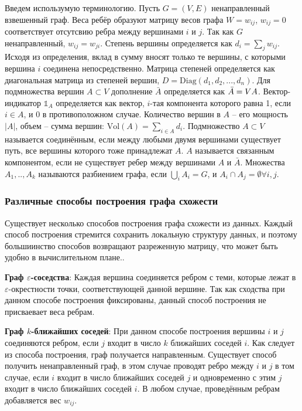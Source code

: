Введем использумую терминологию. Пусть $G=(V,E)$ ненаправленный взвешенный граф. Веса ребёр образуют матрицу весов графа $W = w_{ij}$, $w_{ij}=0$ соответствует отсутсвию ребра между вершинами $i$ и $j$. Так как $G$ ненаправленный, $w_{ij} = w_{ji}$. Степень вершины определяется как $d_i = \sum_j w_{ij}$. Исходя из определения, вклад в сумму вносят только те вершины, с которыми вершина $i$ соединена непосредственно. Матрица степеней определяется как диагональная матрица из степеней вершин, $D=\text{Diag}(d_1,d_2,...,d_n)$. Для подмножества вершин $A \subset V$ дополнение $\bar{A}$ определяется как $\bar{A} = V \\ A$. Вектор-индикатор $\mathbb{1}_A$ определяется как вектор, $i$-тая компонента которого равна 1, если $i \in A$, и 0 в противоположном случае. Количество вершин в $A$ -- его мощность $|A|$, объем -- сумма вершин: $\text{Vol}(A) = \sum_{i \in A} d_i$. Подмножество $A \subset V$ называется соединённым, если между любыми двумя вершинами существует путь, все вершины которого тоже принадлежат $A$. $A$ называется связанным компонентом, если не существует ребер между вершинами $A$ и $\bar{A}$. Множества $A_1,..,A_k$ называются разбиением графа, если $\bigcup_i A_i = G$, и $A_i \cap A_j = \emptyset \forall i,j$.

\subsubsection{Различные способы построения графа схожести}
Существует несколько способов построения графа схожести из данных. Каждый способ построения стремится сохранить локальную структуру данных, и поэтому большиинство способов возвращают разреженную матрицу, что может быть удобно в вычислительном плане\cite{von2007tutorial}..

\textbf{Граф $\varepsilon$-соседства}: Каждая вершина соединяется ребром с теми, которые лежат в $\varepsilon$-окрестности точки, соответствующей данной вершине. Так как сходства при данном способе построения фиксированы, данный способ построения не присваевает веса ребрам.

\textbf{Граф $k$-ближайших соседей}: При данном способе построения вершины $i$ и $j$ соединяются ребром, если $j$ входит в число $k$ ближайших соседей $i$. Как следует из способа построения, граф получается направленным. Существует способ получить ненаправленный граф, в этом случае проводят ребро между $i$ и $j$ в том случае, если $i$ входит в число ближайших соседей $j$ и одновременно с этим $j$ входит в число ближайших соседей $i$. В любом случае, проведённым ребрам добавляется вес $w_{ij}$.

